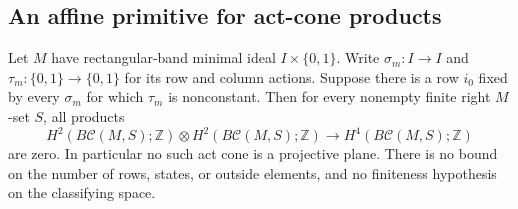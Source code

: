 \subsection{An affine primitive for act-cone products}

\begin{theorem}
\label{C:act-common-fixed-row-cups}
Let $M$ have rectangular-band minimal ideal $I\times\{0,1\}$.
Write $\sigma_m:I\to I$ and
$\tau_m:\{0,1\}\to\{0,1\}$ for its row and column actions.
Suppose there is a row $i_0$ fixed by every $\sigma_m$ for which
$\tau_m$ is nonconstant.  Then for every nonempty finite right
$M$-set $S$, all products
\[
 H^2(B\mathcal C(M,S);\mathbb Z)\otimes
 H^2(B\mathcal C(M,S);\mathbb Z)
       \longrightarrow H^4(B\mathcal C(M,S);\mathbb Z)
\]
are zero.  In particular no such act cone is a projective plane.
There is no bound on the number of rows, states, or outside elements,
and no finiteness hypothesis on the classifying space.
\end{theorem}
